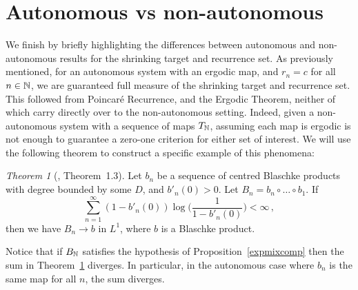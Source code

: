 \documentclass[11pt,reqno]{amsart}
\newcommand{\N}{{\Bbb N}}
\newcommand{\0}{\mathbf{0}}
\newtheorem{theorem}{Theorem}
\theoremstyle{remark}
\numberwithin{equation}{section}
\newtheorem{theorem}{Theorem}[section]
\theoremstyle{remark}
\numberwithin{equation}{section}
\begin{document}
\medskip

\section{Autonomous vs non-autonomous}\label{autnonaut}
We finish by briefly highlighting the differences between autonomous and non-autonomous results for the shrinking target and recurrence set. As previously mentioned, for an autonomous system with an ergodic map, and $r_n=c$ for all $n \in \N$, we are guaranteed full measure of the shrinking target and recurrence set. This followed from Poincar\'{e} Recurrence, and the Ergodic Theorem, neither of which carry directly over to the non-autonomous setting.
Indeed, given a non-autonomous system with a sequence of maps $T_\N$,  assuming each map is ergodic is not enough to guarantee a zero-one criterion for either set of interest. We will use the following theorem to construct a specific example of this phenomena:
\begin{theorem}[\cite{gust}, Theorem~1.3]\label{thmfer}
     Let $b_n$ be a sequence of centred Blaschke products with degree bounded by some $D$, and $b'_n(0)>0$. Let $B_n=b_n \circ\dots\circ b_1$. If 
    $$
    \sum\limits_{n=1}^ \infty (1-b'_n(0))\log\big(\frac{1}{1-b'_n(0)}\big) < \infty \, ,
    $$
   then we have $B_n \to b$ in $L^1$, where $b$ is a Blaschke product.
\end{theorem}
    Notice that if $B_\N$ satisfies the hypothesis of Proposition~\ref{expmixcomp} then the sum in Theorem~\ref{thmfer} diverges. In particular, in the autonomous case where $b_n$ is the same map for all $n$, the sum diverges.
\end{document}
